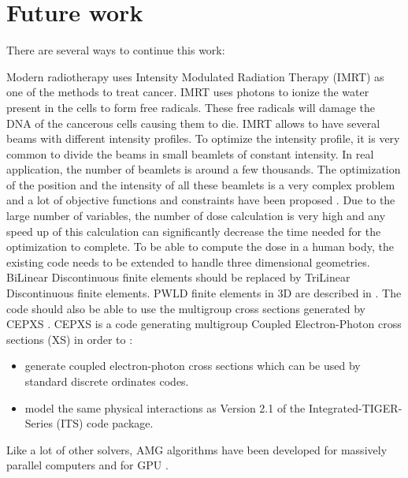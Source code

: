 \section{Future work}
There are several ways to continue this work:
\begin{long_description}
  \item[Extension for medical applications:] Modern radiotherapy uses Intensity 
    Modulated Radiation Therapy (IMRT) as one of the methods to
    treat cancer. IMRT uses photons to ionize the water present in the cells
    to form free radicals. These free radicals will damage the DNA of the
    cancerous cells causing them to die. IMRT allows to have several beams with 
    different intensity  profiles. To optimize the intensity profile, it is 
    very common to divide the beams in small beamlets of constant intensity. 
    In real application, the number of beamlets is around a few thousands. 
    The optimization of the position and the intensity of all these beamlets
    is a very complex problem and a lot of objective functions and 
    constraints have been proposed \cite{minima,dose-volume,complexity,math}.
    Due to the large number of variables, the number of dose calculation is
    very high and any speed up of this calculation can significantly decrease
    the time needed for the optimization to complete.
    To be able to compute the dose in a human body, the existing code needs 
    to be extended to handle three dimensional geometries. BiLinear 
    Discontinuous finite elements should be replaced by TriLinear Discontinuous 
    finite elements. PWLD finite elements in 3D are described in \cite{pwld_3d}. 
    The code should also be able to use the multigroup cross sections generated by 
    CEPXS \cite{cepxs}. CEPXS is a code generating multigroup Coupled 
    Electron-Photon cross sections (XS) in order to \cite{cepxs}:
    \begin{itemize}
      \item generate coupled electron-photon cross sections which can be used by
        standard discrete ordinates codes.
      \item model the same physical interactions as Version 2.1 of the
        Integrated-TIGER-Series (ITS) code package.
    \end{itemize}
  \item[AMG for DSA on massively parallel computers:] Like a lot of other
    solvers, AMG algorithms have been developed for massively parallel
    computers \cite{amg_multicore,amg_parallel} and for GPU \cite{nvidia}.

\end{long_description}
